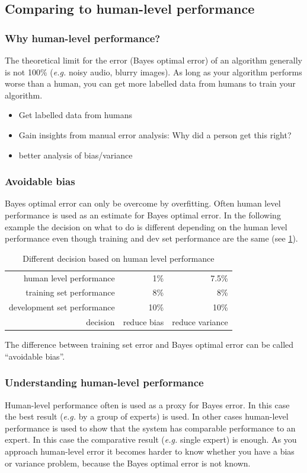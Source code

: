 \documentclass{article}
\begin{document}
\subsection{Comparing to human-level performance}
\subsubsection{Why human-level performance?}
The theoretical limit for the error (Bayes optimal error) of an algorithm generally is not 100\%
(\emph{e.g.} noisy audio, blurry images).
As long as your algorithm performs worse than a human, you can get more labelled data from humans to train your algorithm.
\begin{itemize}
  \item Get labelled data from humans
  \item Gain insights from manual error analysis: Why did a person get this right?
  \item better analysis of bias/variance
\end{itemize}

\subsubsection{Avoidable bias}
Bayes optimal error can only be overcome by overfitting.
Often human level performance is used as an estimate for Bayes optimal error.
In the following example the decision on what to do is different depending on the human level performance
even though training and dev set performance are the same (see \cref{tbl:human}).
\begin{table}[htbp]
  \begin{center}
    \begin{tabular}{r|r|r}
      human level performance     & 1\%  & 7.5\% \\
      training set performance    & 8\%  & 8\%   \\
      development set performance & 10\% & 10\%  \\\hline
      decision & reduce bias & reduce variance
    \end{tabular}
    \caption{Different decision based on human level performance\label{tbl:human}}
  \end{center}
\end{table}
The difference between training set error and Bayes optimal error can be called ``avoidable bias''.

\subsubsection{Understanding human-level performance}
Human-level performance often is used as a proxy for Bayes error.
In this case the best result (\emph{e.g.} by a group of experts) is used.
In other cases human-level performance is used to show that the system has comparable performance to an expert.
In this case the comparative result (\emph{e.g.} single expert) is enough.
As you approach human-level error it becomes harder to know whether you have a bias or variance problem,
because the Bayes optimal error is not known.
\end{document}
